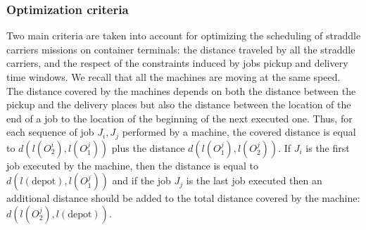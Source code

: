 \documentclass[a4paper,10pt]{article}
\begin{document}
\subsubsection{Optimization criteria}

Two main criteria are taken into account for optimizing the scheduling of straddle carriers missions on container terminals: the distance traveled by all the straddle carriers, and the respect of the constraints induced by jobs pickup and delivery time windows. We recall that all the machines are moving at the same speed. \\

The distance covered by the machines depends on both the distance between the pickup and the delivery places but also the distance between the location of the end of a job to the location of the beginning of the next executed one. Thus, for each sequence of job $J_i,J_j$ performed by a machine, the covered distance is equal to $d(l(O^i_2), l(O^j_1))$ plus the distance $d(l(O^j_1), l(O^j_2))$. If $J_i$ is the first job executed by the machine, then the distance is equal to $d(l(\mbox{depot}),l(O^j_1))$ and if the job $J_j$ is the last job executed then an additional distance should be added to the total distance covered by the machine: $d(l(O^j_2),l(\mbox{depot}))$.

%


%
\end{document}
